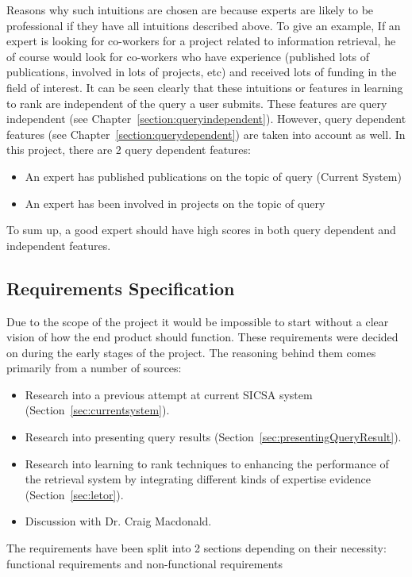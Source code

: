 Reasons why such intuitions are chosen are because experts are likely to be professional if they have all intuitions described above. To give an example,
If an expert is looking for co-workers for a project related to information retrieval, he of course would look for co-workers who have experience 
(published lots of publications, involved in lots of projects, etc) and received lots of funding in the field of interest.
It can be seen clearly that these intuitions or features in learning to rank are independent of the query a user submits. These features are query independent
(see Chapter~\ref{section:queryindependent}). However, query dependent features (see Chapter~\ref{section:querydependent}) are taken into account as well. 
In this project, there are 2 query dependent features: 
\begin{itemize}
 \item An expert has published publications on the topic of query (Current System)
 \item An expert has been involved in projects on the topic of query
\end{itemize}

To sum up, a good expert should have high scores in both query dependent and independent features.

\subsection{Requirements Specification}\label{sec:requirements}
Due to the scope of the project it would be impossible to start without a clear vision of how
the end product should function. These requirements were decided on during the early stages of the project. 
The reasoning behind them comes primarily from a number of sources:
\begin{itemize}
 \item Research into a previous attempt at current SICSA system (Section~\ref{sec:currentsystem}).
 \item Research into presenting query results (Section~\ref{sec:presentingQueryResult}).
 \item Research into learning to rank techniques to enhancing the performance of the retrieval system by integrating different kinds of 
 expertise evidence (Section~\ref{sec:letor}).
 \item Discussion with Dr. Craig Macdonald.
\end{itemize}
The requirements have been split into 2 sections depending on their necessity: functional requirements and non-functional requirements

